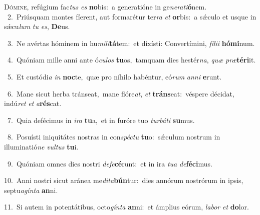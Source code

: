 \lettrine{\initial\textcolor{\initialcolor}{D}}{ómine,} refúgium fac\textit{tus} \textit{es} \textbf{no}\-bis:~\star a generatióne in ge\-\textit{ne}\-\textit{ra}\textit{ti}\textbf{ó}nem.\\
{\numbfont\textcolor{\numbcolor}{~2.}}~Priúsquam montes fíerent, aut formarétur ter\textit{ra} \textit{et} \textbf{or}\-bis:~\star a sǽculo et usque in sǽcu\textit{lum} \textit{tu} \textit{es}\-, \textbf{De}\-us.\par
{\numbfont\textcolor{\numbcolor}{~3.}}~Ne avértas hóminem in hu\-\textit{mi}\-\textit{li}\textbf{tá}tem:~\star et dixísti: Convertímini, \textit{fí}\-\textit{li}\textit{i} \textbf{hó}\-\textbf{mi}num.\par
{\numbfont\textcolor{\numbcolor}{~4.}}~Quóniam mille anni ante ó\-\textit{cu}\-\textit{los} \textbf{tu}\-os,~\star tamquam dies hestér\-\textit{na}\-, \textit{quæ} \textit{præ}\-\textbf{tér}\textbf{i}it.\par
{\numbfont\textcolor{\numbcolor}{~5.}}~Et custódi\textit{a} \textit{in} \textbf{noc}\-te,~\star quæ pro níhilo habéntur, eó\textit{rum} \textit{an}\-\textit{ni} \textbf{e}\-runt.\par
{\numbfont\textcolor{\numbcolor}{~6.}}~Mane sicut herba tránseat,~\dagger mane flóre\-\textit{at}\-, \textit{et} \textbf{tráns}\-eat:~\star véspere décidat, indú\textit{ret} \textit{et} \textit{a}\-\textbf{rés}cat.\par
{\numbfont\textcolor{\numbcolor}{~7.}}~Quia defécimus in \textit{i}\-\textit{ra} \textbf{tu}\-a,~\star et in furóre tuo \textit{tur}\-\textit{bá}\textit{ti} \textbf{su}\-mus.\par
{\numbfont\textcolor{\numbcolor}{~8.}}~Posuísti iniquitátes nostras in con\-\textit{spéc}\-\textit{tu} \textbf{tu}\-o:~\star sǽculum nostrum in illuminatió\textit{ne} \textit{vul}\-\textit{tus} \textbf{tu}\-i.\par
{\numbfont\textcolor{\numbcolor}{~9.}}~Quóniam omnes dies nostri \textit{de}\-\textit{fe}\textbf{cé}runt:~\star et in ira \textit{tu}\-\textit{a} \textit{de}\-\textbf{fé}\textbf{ci}mus.\par
{\numbfont\textcolor{\numbcolor}{10.}}~Anni nostri sicut aránea me\-\textit{di}\-\textit{ta}\textbf{bún}tur:~\star dies annórum nostrórum in ipsis, septu\-\textit{a}\-\textit{gín}\textit{ta} \textbf{an}\-ni.\par
{\numbfont\textcolor{\numbcolor}{11.}}~Si autem in potentátibus, octo\-\textit{gín}\-\textit{ta} \textbf{an}\-ni:~\star et ámplius eórum, \textit{la}\-\textit{bor} \textit{et} \textbf{do}\-lor.\par
